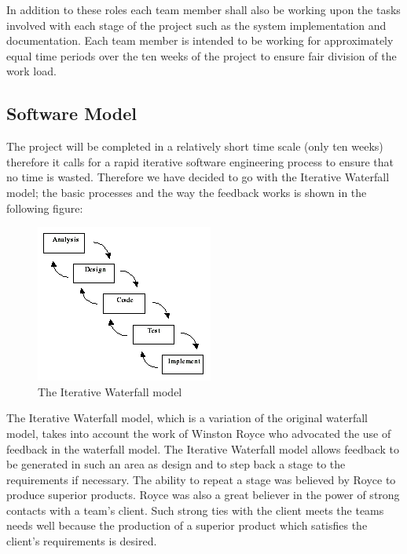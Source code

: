 In addition to these roles each team member shall also be working upon the tasks involved with each stage of the project such as the system implementation and documentation. Each team member is intended to be working for approximately equal time periods over the ten weeks of the project to ensure fair division of the work load.

\subsection{Software Model}
\label{sec:SoftwareModel}
The project will be completed in a relatively short time scale (only ten weeks) therefore it calls for a rapid iterative software engineering process to ensure that no time is wasted. Therefore we have decided to go with the Iterative Waterfall model; the basic processes and the way the feedback works is shown in the following figure:

\begin{figure}[h1]
\begin{center}
 \includegraphics[trim = 0mm 0mm 0mm 0mm, clip, scale=0.6]{Images/iterativewaterfallmodel.png}
  \caption{The Iterative Waterfall model}\label{fig:iterativeWaterfall}
 \end{center}
\end{figure}

The Iterative Waterfall model, which is a variation of the original waterfall model, takes into account the work of Winston 
Royce \cite{Royce} who advocated the use of feedback in the waterfall model. The Iterative Waterfall model allows 
feedback to be generated in such an area as design and to step back a stage to the requirements if necessary. The ability to repeat a stage was believed by Royce to produce superior products. Royce was also a great believer in the power of strong contacts with a team's client. 
Such strong ties with the client meets the teams needs well because the production of a superior product which satisfies the client's requirements is desired. 

